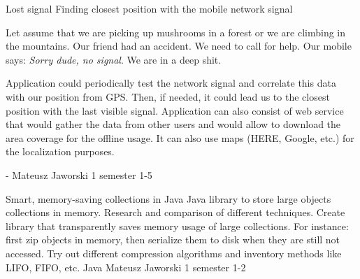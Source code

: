 \begin{project}
{Lost signal}
{Finding closest position with the mobile network signal} 
{ 
Let assume that we are picking up mushrooms in a forest or we are climbing in
the mountains. Our friend had an accident. We need to call for help. Our mobile
says: \textit{Sorry dude, no signal}. We are in a deep shit.\linebreak

Application could periodically test the network signal and correlate this data
with our position from GPS. Then, if needed, it could lead us to the closest
position with the last visible signal. Application can also consist of web service that would
gather the data from other users and would allow to download the area coverage
for the offline usage. It can also use maps (HERE, Google, etc.) for the
localization purposes.
}
{-}
{Mateusz Jaworski}
{1 semester}
{1-5}
\end{project}
\begin{project}
{Smart, memory-saving collections in Java}
{Java library to store large objects collections in memory. Research and comparison of different techniques.} 
{ 
Create library that transparently saves memory usage of large collections. 
For instance: first zip objects in memory, then serialize them to disk when
they are still not accessed. Try out different compression algorithms and
inventory methods like LIFO, FIFO, etc.
}
{Java}
{Mateusz Jaworski}
{1 semester}
{1-2}
\end{project}
